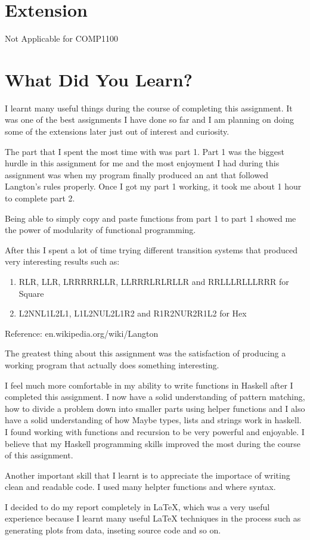\documentclass[12pt]{article}
\begin{document}
\section{Extension}

Not Applicable for COMP1100

\break

\section{What Did You Learn?}

\hfill

I learnt many useful things during the course of completing this assignment. It was one of the best assignments I have done so far and I am planning on doing some of the extensions later just out of interest and curiosity.

The part that I spent the most time with was part 1. Part 1 was the biggest hurdle in this assignment for me and the most enjoyment I had during this assignment was when my program finally produced an ant that followed Langton's rules properly. Once I got my part 1 working, it took me about 1 hour to complete part 2.

Being able to simply copy and paste functions from part 1 to part 1 showed me the power of modularity of functional programming.

After this I spent a lot of time trying different transition systems that produced very interesting results such as:

\begin{enumerate}
\item RLR, LLR, LRRRRRLLR, LLRRRLRLRLLR and RRLLLRLLLRRR for Square
\item L2NNL1L2L1, L1L2NUL2L1R2 and R1R2NUR2R1L2 for Hex
\end{enumerate}

Reference: en.wikipedia.org/wiki/Langton%

The greatest thing about this assignment was the satisfaction of producing a working program that actually does something interesting.

I feel much more comfortable in my ability to write functions in Haskell after I completed this assignment. I now have a solid understanding of pattern matching, how to divide a problem down into smaller parts using helper functions and I also have a solid understanding of how Maybe types, lists and strings work in haskell. I found working with functions and recursion to be very powerful and enjoyable. I believe that my Haskell programming skills improved the most during the course of this assignment.

Another important skill that I learnt is to appreciate the importace of writing clean and readable code. I used many helpter functions and where syntax.

I decided to do my report completely in LaTeX, which was a very useful experience because I learnt many useful LaTeX techniques in the process such as generating plots from data, inseting source code and so on.
\end{document}
